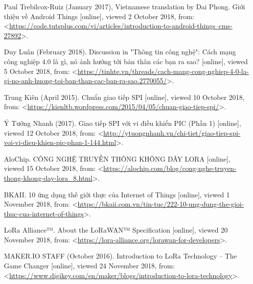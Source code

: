 \begin{thebibliography}{10}
Paul Trebilcox-Ruiz (January 2017), Vietnamese translation by Dai Phong. Giới thiệu về Android Things [online], viewed 2 October 2018, from: <\href{https://code.tutsplus.com/vi/articles/introduction-to-android-things--cms-27892}{https://code.tutsplus.com/vi/articles/introduction-to-android-things--cms-27892}>.

Duy Luân (February 2018). Discussion in "Thông tin công nghệ": Cách mạng công nghiệp 4.0 là gì, nó ảnh hưởng tới bản thân các bạn ra sao? [online], viewed 5 October 2018, from: <\href{https://tinhte.vn/threads/cach-mang-cong-nghiep-4-0-la-gi-no-anh-huong-toi-ban-than-cac-ban-ra-sao.2770055/}{https://tinhte.vn/threads/cach-mang-cong-nghiep-4-0-la-gi-no-anh-huong-toi-ban-than-cac-ban-ra-sao.2770055/}>.

Trung Kiên (April 2015). Chuẩn giao tiếp SPI [online], viewed 10 October 2018, from: <\href{https://kienltb.wordpress.com/2015/04/05/chuan-giao-tiep-spi/}{https://kienltb.wordpress.com/2015/04/05/chuan-giao-tiep-spi/}>.

Ý Tưởng Nhanh (2017). Giao tiếp SPI với vi điều khiển PIC (Phần 1) [online], viewed 12 October 2018, from: <\href{http://ytuongnhanh.vn/chi-tiet/giao-tiep-spi-voi-vi-dieu-khien-pic-phan-1-144.html}{http://ytuongnhanh.vn/chi-tiet/giao-tiep-spi-voi-vi-dieu-khien-pic-phan-1-144.html}>.

AloChip. CÔNG NGHỆ TRUYỀN THÔNG KHÔNG DÂY LORA [online], viewed 15 October 2018, from: <\href{https://alochip.com/blog/cong-nghe-truyen-thong-khong-day-lora\_8.html}{https://alochip.com/blog/cong-nghe-truyen-thong-khong-day-lora\_8.html}>.

BKAII. 10 ứng dụng thế giới thực của Internet of Things [online], viewed 1 November 2018, from: <\href{https://bkaii.com.vn/tin-tuc/222-10-ung-dung-the-gioi-thuc-cua-internet-of-things}{https://bkaii.com.vn/tin-tuc/222-10-ung-dung-the-gioi-thuc-cua-internet-of-things}>.

LoRa Alliance™. About the LoRaWAN™ Specification [online], viewed 20 November 2018, from: <\href{https://lora-alliance.org/lorawan-for-developers}{https://lora-alliance.org/lorawan-for-developers}>.

MAKER.IO STAFF (October 2016). Introduction to LoRa Technology – The Game Changer [online], viewed 24 November 2018, from: <\href{https://www.digikey.com/en/maker/blogs/introduction-to-lora-technology}{https://www.digikey.com/en/maker/blogs/introduction-to-lora-technology}>.


\end{thebibliography}
